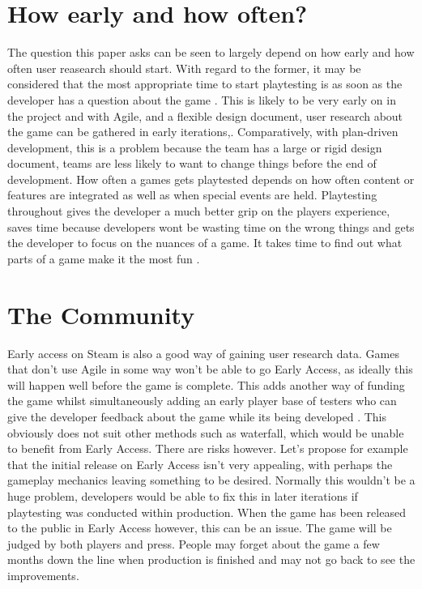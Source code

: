 \documentclass{scrartcl}
\begin{document}
\section{How early and how often?}

The question this paper asks can be seen to largely depend on how early and how often user reasearch should start. With regard to the former, it may be considered that the most appropriate time to start playtesting is as soon as the developer has a question about the game \cite{GDCSharks,}. This is likely to be very early on in the project and with Agile, and a flexible design document, user research about the game can be gathered in early iterations,. Comparatively, with plan-driven development, this is a problem because the team has a large or rigid design document, teams are less likely to want to change things before the end of development. How often a games gets playtested depends on how often content or features are integrated as well as when special events are held. Playtesting throughout gives the developer a much better grip on the players experience, saves time because developers wont be wasting time on the wrong things and gets the developer to focus on the nuances of a game. It takes time to find out what parts of a game make it the most fun \cite{GDCAED,}.


\section{The Community}

Early access on Steam is also a good way of gaining user research data\cite{GamesEA,}. 
Games that don't use Agile in some way won't be able to go Early Access, as ideally this will happen well before the game is complete. This adds another way of funding the game whilst simultaneously adding an early player base of testers who can give the developer feedback about the game while its being developed \cite{GDCOTC,}. This obviously does not suit other methods such as waterfall, which would be unable to benefit from Early Access. 
There are risks however. Let's propose for example that the initial release on Early Access isn't very appealing, with perhaps the gameplay mechanics leaving something to be desired. Normally this wouldn't be a huge problem, developers would be able to fix this in later iterations if playtesting was conducted within production. When the game has been released to the public in Early Access however, this can be an issue. The game will be judged by both players and press. People may forget about the game a few months down the line when production is finished and may not go back to see the improvements.
\end{document}
